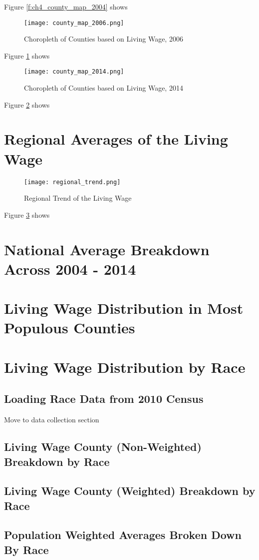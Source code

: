 Figure \ref{f:ch4_county_map_2004} shows

\begin{figure}[hbt]
    \centering
        \texttt{[image: county\_map\_2006.png]}
        \caption{Choropleth of Counties based on Living Wage, 2006}
    \label{f:ch4_county_map_2006}
\end{figure}

Figure \ref{f:ch4_county_map_2006} shows

\begin{figure}[hbt]
    \centering
        \texttt{[image: county\_map\_2014.png]}
        \caption{Choropleth of Counties based on Living Wage, 2014}
    \label{f:ch4_county_map_2014}
\end{figure}

Figure \ref{f:ch4_county_map_2014} shows

\section{Regional Averages of the Living Wage}

\begin{figure}[hbt]
    \centering
        \texttt{[image: regional\_trend.png]}
        \caption{Regional Trend of the Living Wage}
    \label{f:ch4_regional_trend}
\end{figure}

Figure \ref{f:ch4_regional_trend} shows

\section{National Average Breakdown Across 2004 - 2014}

\section{Living Wage Distribution in Most Populous Counties}

\section{Living Wage Distribution by Race}

\subsection{Loading Race Data from 2010 Census}

Move to data collection section
	
\subsection{Living Wage County (Non-Weighted) Breakdown by Race}

\subsection{Living Wage County (Weighted) Breakdown by Race}

\subsection{Population Weighted Averages Broken Down By Race}


